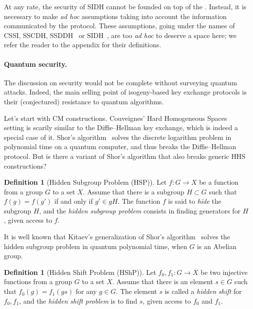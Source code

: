 \documentclass{report}
\theoremstyle{plain}
\theoremstyle{definition}
\newtheorem{definition}[theorem]{Definition}
\begin{document}
At any rate, the security of SIDH cannot be founded on top of the
. %
Instead, it is necessary to make \emph{ad hoc} assumptions taking into
account the information communicated by the protocol. %
These assumptions, going under the names of CSSI, SSCDH,
SSDDH~\cite{jao+defeo2011,defeo+jao+plut12} or SIDH~\cite{SIKE}, are
too \emph{ad hoc} to deserve a space here; we refer the reader to the
appendix for their definitions.

\paragraph{Quantum security.}
The discussion on security would not be complete without surveying
quantum attacks. %
Indeed, the main selling point of isogeny-based key exchange protocols
is their (conjectured) resistance to quantum algorithms. %

Let's start with CM constructions. %
Couveignes' Hard Homogeneous Spaces setting is scarily similar to the
Diffie--Hellman key exchange, which is indeed a special case of it. %
Shor's algorithm~\cite{shor1994algorithms} solves the discrete
logarithm problem in polynomial time on a quantum computer, and thus
breaks the Diffie--Hellman protocol. %
But is there a variant of Shor's algorithm that also breaks generic
HHS constructions? %

\begin{definition}[Hidden Subgroup Problem (HSP)]
  Let $f:G→X$ be a function from a group $G$ to a set $X$. %
  Assume that there is a subgroup $H⊂G$ such that $f(g)=f(g')$ if and
  only if $g'∈gH$. %
  The function $f$ is said to \emph{hide} the subgroup $H$, and the
  \emph{hidden subgroup problem} consists in finding generators for
  $H$, given access to $f$.
\end{definition}

It is well known that Kitaev's generalization of Shor's
algorithm~\cite{kitaev1995hsp} solves the hidden subgroup problem in
quantum polynomial time, when $G$ is an Abelian group. %

\begin{definition}[Hidden Shift Problem (HShP)]
  Let $f_0,f_1:G→X$ be two injective functions from a group $G$ to a
  set $X$. %
  Assume that there is an element $s∈G$ such that $f_0(g)=f_1(gs)$ for
  any $g∈G$. %
  The element $s$ is called a \emph{hidden shift} for $f_0,f_1$, and
  the \emph{hidden shift problem} is to find $s$, given access to
  $f_0$ and $f_1$. %
\end{definition}
\end{document}
